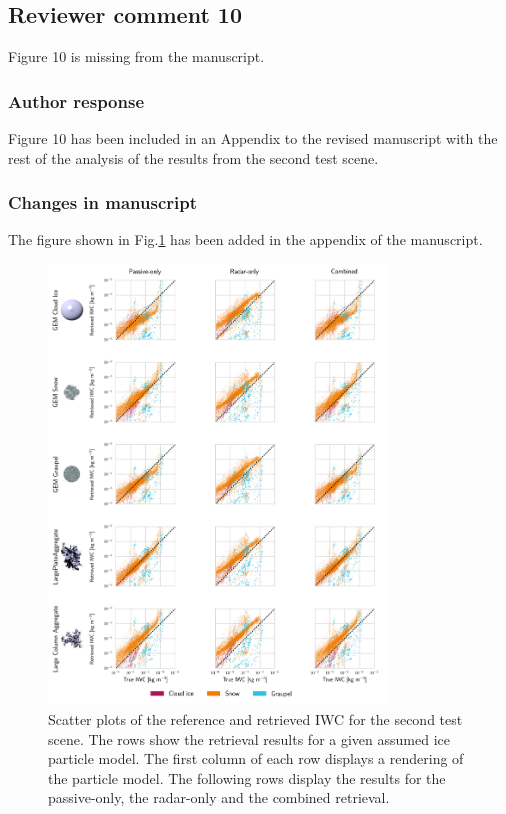 \subsection*{Reviewer comment 10}

Figure 10 is missing from the manuscript.

\subsubsection*{Author response}

Figure 10 has been included in an Appendix to the revised manuscript with the
rest of the analysis of the results from the second test scene.

\subsubsection*{Changes in manuscript}

The figure shown in Fig.\ref{fig:results_scatter_b} has been added in the appendix
of the manuscript.

\begin{figure}[!h]
\centering
\includegraphics[width = 0.8\textwidth]{../plots/results_scatter_b}
\caption{Scatter plots of the reference and retrieved IWC for
  the second test scene. The rows show the retrieval results for a given
  assumed ice particle model. The first column of each row displays a rendering
  of the particle model. The following rows display the results for the
  passive-only, the radar-only and the combined retrieval.}
\label{fig:results_scatter_b}
\end{figure}




